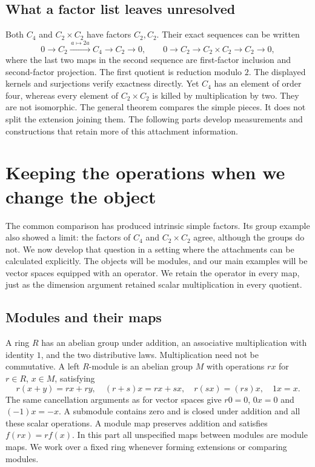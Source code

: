 \documentclass[11pt]{article}
\theoremstyle{definition}
\theoremstyle{remark}\newtheorem{remark}[theorem]{Remark}
\begin{document}
\subsection{What a factor list leaves unresolved}\label{e:extensions}

Both $C_4$ and $C_2\times C_2$ have factors $C_2,C_2$. Their exact sequences
can be written
\[
0\longrightarrow C_2\xrightarrow{\,a\mapsto2a\,}C_4
\longrightarrow C_2\longrightarrow0,
\qquad
0\longrightarrow C_2\longrightarrow C_2\times C_2
\longrightarrow C_2\longrightarrow0,
\]
where the last two maps in the second sequence are first-factor inclusion
and second-factor projection. The first quotient is reduction modulo $2$.
The displayed kernels and surjections verify exactness directly.
Yet $C_4$ has an element of order four, whereas every element of
$C_2\times C_2$ is killed by multiplication by two. They are not isomorphic.
The general theorem compares the simple pieces. It does not split the
extension joining them. The following parts develop measurements and
constructions that retain more of this attachment information.



\section{Keeping the operations when we change the object}
\label{m:section}

The common comparison has produced intrinsic simple factors. Its group example
also showed a limit: the factors of $C_4$ and $C_2\times C_2$ agree, although
the groups do not. We now develop that question in a setting where the
attachments can be calculated explicitly. The objects will be modules,
and our main examples will be vector spaces equipped with an operator.
We retain the operator in every map, just as the dimension argument
retained scalar multiplication in every quotient.

\subsection{Modules and their maps}

A ring $R$ has an abelian group under addition, an associative multiplication
with identity $1$, and the two distributive laws. Multiplication need not be
commutative. A left $R$-module is an abelian group $M$ with operations $rx$
for $r\in R$, $x\in M$, satisfying
\[
 r(x+y)=rx+ry,\quad (r+s)x=rx+sx,\quad
 r(sx)=(rs)x,\quad 1x=x.
\]
The same cancellation arguments as for vector spaces give $r0=0$,
$0x=0$ and $(-1)x=-x$. A submodule contains zero and is closed under
addition and all these scalar operations. A module map preserves addition
and satisfies $f(rx)=rf(x)$. In this part all unspecified maps between
modules are module maps. We work over a fixed ring whenever forming
extensions or comparing modules.
\end{document}
